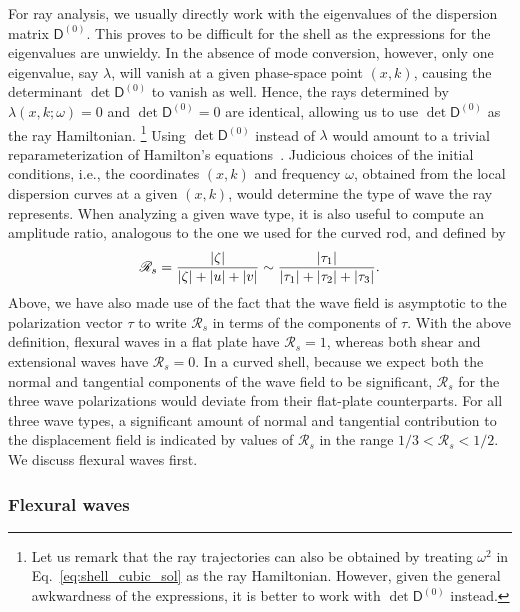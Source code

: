 For ray analysis, we usually directly work with the eigenvalues of the dispersion matrix $\mathsf{D}^{(0)}$.
This proves to be difficult for the shell as the expressions for the eigenvalues are unwieldy.
In the absence of mode conversion, however, only one eigenvalue, say $\lambda$, will vanish at a given phase-space point $(x, k)$, causing the determinant $\det\mathsf{D}^{(0)}$ to vanish as well.
Hence, the rays determined by $\lambda(x, k; \omega) = 0$ and $\det\mathsf{D}^{(0)} = 0$ are identical, allowing us to use $\det\mathsf{D}^{(0)}$ as the ray Hamiltonian.%
\footnote{Let us remark that the ray trajectories can also be obtained by treating $\omega^{2}$ in Eq.~\eqref{eq:shell_cubic_sol} as the ray Hamiltonian.  However, given the general awkwardness of the expressions, it is better to work with $\det\mathsf{D}^{(0)}$ instead.}
Using $\det\mathsf{D}^{(0)}$ instead of $\lambda$ would amount to a trivial reparameterization of Hamilton's equations~\cite{tracy2014}.
Judicious choices of the initial conditions, i.e., the coordinates $(x, k)$ and frequency $\omega$, obtained from the local dispersion curves at a given $(x, k)$, would determine the type of wave the ray represents.
When analyzing a given wave type, it is also useful to compute an amplitude ratio, analogous to the one we used for the curved rod, and defined by
%
\begin{equation}
  \mathscr{R}_{s} = \frac{\lvert\zeta\rvert}{\lvert\zeta\rvert + \lvert u\rvert + \lvert v\rvert} \sim \frac{\lvert\tau_{1}\rvert}{\lvert\tau_{1}\rvert + \lvert\tau_{2}\rvert + \lvert\tau_{3}\rvert}.
  \label{eq:shell_ratio}
\end{equation}
%
Above, we have also made use of the fact that the wave field is asymptotic to the polarization vector $\tau$ to write $\mathscr{R}_{s}$ in terms of the components of $\tau$.
With the above definition, flexural waves in a flat plate have $\mathscr{R}_{s} = 1$, whereas both shear and extensional waves have $\mathscr{R}_{s} = 0$.
In a curved shell, because we expect both the normal and tangential components of the wave field to be significant, $\mathscr{R}_{s}$ for the three wave polarizations would deviate from their flat-plate counterparts.
For all three wave types, a significant amount of normal and tangential contribution to the displacement field is indicated by values of $\mathscr{R}_{s}$ in the range $1/3 < \mathscr{R}_{s} < 1/2$.
We discuss flexural waves first.

\subsubsection*{Flexural waves}
\label{sec:shell_flexural}

